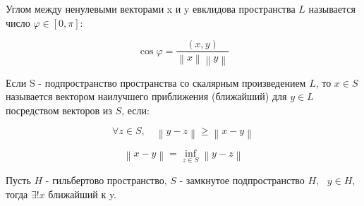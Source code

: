 \documentclass[12pt, a4paper]{report}
\begin{document}
\fi


\begin{definition}
     Углом между ненулевыми векторами x и y  евклидова пространства \( L  \)  называется число \( \varphi \in  [ 0, \pi ] \):

     \[ \cos \varphi = \frac{(x,y )}{\left\lVert x  \right\rVert \left\lVert y  \right\rVert}  \] 
\end{definition}

\begin{definition}
    Если S - подпространство пространства со скалярным произведением \( L \), то \( x \in  S  \)  называется вектором наилучшего приближения (ближайший) для \( y \in L      \)  посредством векторов из \( S  \), если: 

    \[ \forall z \in  S , \quad  \left\lVert y - z  \right\rVert \geq  \left\lVert x - y  \right\rVert \] 

    \[ \left\lVert x - y  \right\rVert  = \inf _{z \in  S } \left\lVert y -z  \right\rVert  \] 
\end{definition}

\begin{theorem}
    Пусть \( H  \)   - гильбертово пространство, \( S  \)   - замкнутое подпространство \( H , \text{  }  y \in  H  \), тогда \( \exists  ! x  \) ближайший к y.
\end{theorem}
\end{document}
